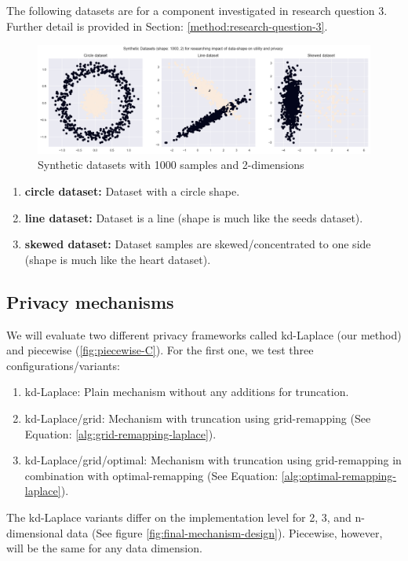 The following datasets are for a component investigated in research question 3.
Further detail is provided in Section: \ref{method:research-question-3}.
\begin{figure}[H]
  \includegraphics[width=1.0\textwidth]{Method/images/rq3.png}
  \caption{Synthetic datasets with 1000 samples and 2-dimensions}
  \label{rq3:synthetic-datasets}
\end{figure}
\begin{enumerate}
  \item \textbf{circle dataset:} Dataset with a circle shape.
  \item \textbf{line dataset:} Dataset is a line (shape is much like the seeds dataset).
  \item \textbf{skewed dataset:} Dataset samples are skewed/concentrated to one side (shape is much like the heart dataset).
\end{enumerate}

\subsection{Privacy mechanisms}
We will evaluate two different privacy frameworks called kd-Laplace (our method) and piecewise (\ref{fig:piecewise-C}).
For the first one, we test three configurations/variants:
\begin{enumerate}
  \item kd-Laplace: Plain mechanism without any additions for truncation.
  \item kd-Laplace/grid: Mechanism with truncation using grid-remapping (See Equation: \ref{alg:grid-remapping-laplace}).
  \item kd-Laplace/grid/optimal: Mechanism with truncation using grid-remapping in combination with optimal-remapping (See Equation: \ref{alg:optimal-remapping-laplace}).
\end{enumerate}
The kd-Laplace variants differ on the implementation level for 2, 3, and n-dimensional data (See figure \ref{fig:final-mechanism-design}).
Piecewise, however, will be the same for any data dimension.

